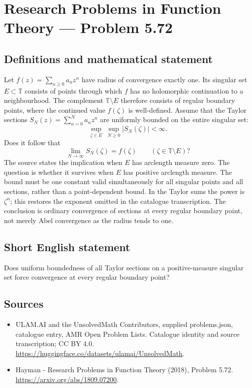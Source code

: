 \documentclass[11pt,a4paper]{article}
\begin{document}
\section*{Research Problems in Function Theory — Problem 5.72}\label{statement}

\subsection{Definitions and mathematical statement}
Let $f(z)=\sum_{n\ge0}a_nz^n$ have radius of convergence exactly one. Its singular set $E\subset\mathbb T$ consists of points through which $f$ has no holomorphic continuation to a neighbourhood. The complement $\mathbb T\setminus E$ therefore consists of regular boundary points, where the continued value $f(\zeta)$ is well-defined.
Assume that the Taylor sections $S_N(z)=\sum_{n=0}^Na_nz^n$ are uniformly bounded on the entire singular set:
\[
\sup_{\zeta\in E}\ \sup_{N\ge0}|S_N(\zeta)|<\infty.
\]
Does it follow that
\[
\lim_{N\to\infty}S_N(\zeta)=f(\zeta)
\qquad(\zeta\in\mathbb T\setminus E)?
\]
The source states the implication when $E$ has arclength measure zero. The question is whether it survives when $E$ has positive arclength measure. The bound must be one constant valid simultaneously for all singular points and all sections, rather than a point-dependent bound.
In the Taylor sums the power is $\zeta^n$; this restores the exponent omitted in the catalogue transcription. The conclusion is ordinary convergence of sections at every regular boundary point, not merely Abel convergence as the radius tends to one.
\subsection{Short English statement}
Does uniform boundedness of all Taylor sections on a positive-measure singular set force convergence at every regular boundary point?
\subsection{Sources}
\begin{itemize}
\item[S1] ULAM.AI and the UnsolvedMath Contributors, supplied problems.json, catalogue entry, AMR Open Problem Lists. Catalogue identity and source transcription; CC BY 4.0.
\url{https://huggingface.co/datasets/ulamai/UnsolvedMath}.
\item[S2] Hayman - Research Problems in Function Theory (2018), Problem 5.72. 
\url{https://arxiv.org/abs/1809.07200}.
\end{itemize}
\end{document}
